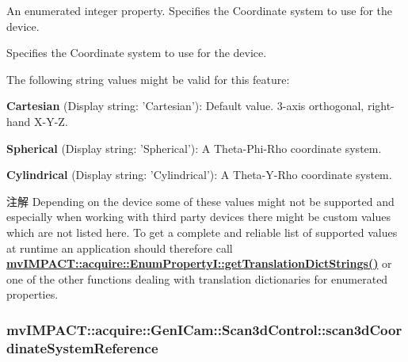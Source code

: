 An enumerated integer property. Specifies the Coordinate system to use for the device. 

Specifies the Coordinate system to use for the device.

The following string values might be valid for this feature\+:
\begin{DoxyItemize}
\item {\bfseries Cartesian} (Display string\+: 'Cartesian')\+: Default value. 3-\/axis orthogonal, right-\/hand X-\/\+Y-\/\+Z.
\item {\bfseries Spherical} (Display string\+: 'Spherical')\+: A Theta-\/\+Phi-\/\+Rho coordinate system.
\item {\bfseries Cylindrical} (Display string\+: 'Cylindrical')\+: A Theta-\/\+Y-\/\+Rho coordinate system.
\end{DoxyItemize}

\begin{DoxyNote}{注解}
Depending on the device some of these values might not be supported and especially when working with third party devices there might be custom values which are not listed here. To get a complete and reliable list of supported values at runtime an application should therefore call {\bfseries \hyperlink{classmv_i_m_p_a_c_t_1_1acquire_1_1_enum_property_i_a0ba6ccbf5ee69784d5d0b537924d26b6}{mv\+I\+M\+P\+A\+C\+T\+::acquire\+::\+Enum\+Property\+I\+::get\+Translation\+Dict\+Strings()}} or one of the other functions dealing with translation dictionaries for enumerated properties. 
\end{DoxyNote}
\hypertarget{classmv_i_m_p_a_c_t_1_1acquire_1_1_gen_i_cam_1_1_scan3d_control_a64896716a0dfaef9053d0643bc3e9196}{
\subsubsection[{scan3d\+Coordinate\+System\+Reference}]{ mv\+I\+M\+P\+A\+C\+T\+::acquire\+::\+Gen\+I\+Cam\+::\+Scan3d\+Control\+::scan3d\+Coordinate\+System\+Reference}}\label{classmv_i_m_p_a_c_t_1_1acquire_1_1_gen_i_cam_1_1_scan3d_control_a64896716a0dfaef9053d0643bc3e9196}


